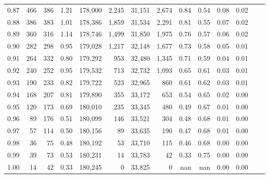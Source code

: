 \begin{tabular}{rrrrrrrrrrrrrr}
0.87 &    466 &  386 &    1.21 &  178,000 &    2,245 &  31,151 &   2,674 &  0.84 &  0.54 &  0.08 &      0.02 \\
0.88 &    386 &  383 &    1.01 &  178,386 &    1,859 &  31,534 &   2,291 &  0.81 &  0.55 &  0.07 &      0.02 \\
0.89 &    360 &  316 &    1.14 &  178,746 &    1,499 &  31,850 &   1,975 &  0.76 &  0.57 &  0.06 &      0.02 \\
0.90 &    282 &  298 &    0.95 &  179,028 &    1,217 &  32,148 &   1,677 &  0.73 &  0.58 &  0.05 &      0.01 \\
0.91 &    264 &  332 &    0.80 &  179,292 &      953 &  32,480 &   1,345 &  0.71 &  0.59 &  0.04 &      0.01 \\
0.92 &    240 &  252 &    0.95 &  179,532 &      713 &  32,732 &   1,093 &  0.65 &  0.61 &  0.03 &      0.01 \\
0.93 &    190 &  233 &    0.82 &  179,722 &      523 &  32,965 &     860 &  0.61 &  0.62 &  0.03 &      0.01 \\
0.94 &    168 &  207 &    0.81 &  179,890 &      355 &  33,172 &     653 &  0.54 &  0.65 &  0.02 &      0.00 \\
0.95 &    120 &  173 &    0.69 &  180,010 &      235 &  33,345 &     480 &  0.49 &  0.67 &  0.01 &      0.00 \\
0.96 &     89 &  176 &    0.51 &  180,099 &      146 &  33,521 &     304 &  0.48 &  0.68 &  0.01 &      0.00 \\
0.97 &     57 &  114 &    0.50 &  180,156 &       89 &  33,635 &     190 &  0.47 &  0.68 &  0.01 &      0.00 \\
0.98 &     36 &   75 &    0.48 &  180,192 &       53 &  33,710 &     115 &  0.46 &  0.68 &  0.00 &      0.00 \\
0.99 &     39 &   73 &    0.53 &  180,231 &       14 &  33,783 &      42 &  0.33 &  0.75 &  0.00 &      0.00 \\
1.00 &     14 &   42 &    0.33 &  180,245 &        0 &  33,825 &       0 &   nan &   nan &  0.00 &      0.00 \\
\bottomrule
\end{tabular}
